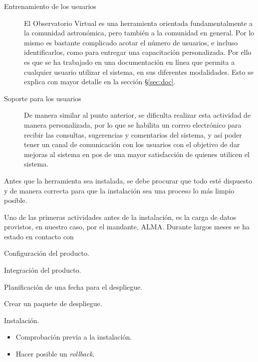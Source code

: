 \begin{description}
\begin{description}
			\item [Entrenamiento de los usuarios] El Observatorio Virtual es una herramienta orientada fundamentalmente a la comunidad astronómica, pero tambi\'en a la comunidad en general. Por lo mismo es bastante complicado acotar el número de usuarios, e incluso identificarlos, como para entregar una capacitación personalizada. Por ello es que se ha trabajado en una documentación en línea que permita a cualquier usuario utilizar el sistema, en sus diferentes modalidades. Esto se explica con mayor detalle en la sección \S\ref{sec:doc}.
			\item [Soporte para los usuarios] De manera similar al punto anterior, se dificulta realizar esta actividad de manera personalizada, por lo que se habilita un correo electrónico\footnotemark{} para recibir las consultas, sugerencias y comentarios del sistema, y así poder tener un canal de comunicación con los usuarios con el objetivo de dar mejoras al sistema en pos de una mayor satisfacción de quienes utilicen el sistema.
		\end{description}
	\item [Preparaciones para la instalación] Antes que la herramienta sea instalada, se debe procurar que todo est\'e dispuesto y de manera correcta para que la instalación sea una proceso lo más limpio posible.
		\begin{description}
			\item [Importación inicial de los datos iniciales del cliente] Uno de las primeras actividades antes de la instalación, es la carga de datos provistos, en nuestro caso, por el mandante, ALMA. Durante largos meses se ha estado en contacto con
			\item Configuración del producto.
			\item Integración del producto.
			\item Planificación de una fecha para el despliegue.
			\item Crear un paquete de despliegue.
		\end{description}
	\item Instalación.
		\begin{itemize}
			\item Comprobación previa a la instalación.
			\item Hacer posible un \emph{rollback}.

\end{itemize}
\end{description}
